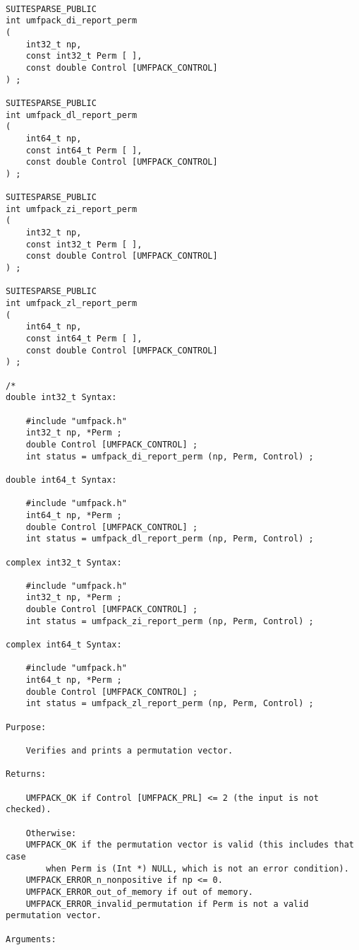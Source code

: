 \documentclass[11pt]{article}
\begin{document}
{\footnotesize
\begin{verbatim}

SUITESPARSE_PUBLIC
int umfpack_di_report_perm
(
    int32_t np,
    const int32_t Perm [ ],
    const double Control [UMFPACK_CONTROL]
) ;

SUITESPARSE_PUBLIC
int umfpack_dl_report_perm
(
    int64_t np,
    const int64_t Perm [ ],
    const double Control [UMFPACK_CONTROL]
) ;

SUITESPARSE_PUBLIC
int umfpack_zi_report_perm
(
    int32_t np,
    const int32_t Perm [ ],
    const double Control [UMFPACK_CONTROL]
) ;

SUITESPARSE_PUBLIC
int umfpack_zl_report_perm
(
    int64_t np,
    const int64_t Perm [ ],
    const double Control [UMFPACK_CONTROL]
) ;

/*
double int32_t Syntax:

    #include "umfpack.h"
    int32_t np, *Perm ;
    double Control [UMFPACK_CONTROL] ;
    int status = umfpack_di_report_perm (np, Perm, Control) ;

double int64_t Syntax:

    #include "umfpack.h"
    int64_t np, *Perm ;
    double Control [UMFPACK_CONTROL] ;
    int status = umfpack_dl_report_perm (np, Perm, Control) ;

complex int32_t Syntax:

    #include "umfpack.h"
    int32_t np, *Perm ;
    double Control [UMFPACK_CONTROL] ;
    int status = umfpack_zi_report_perm (np, Perm, Control) ;

complex int64_t Syntax:

    #include "umfpack.h"
    int64_t np, *Perm ;
    double Control [UMFPACK_CONTROL] ;
    int status = umfpack_zl_report_perm (np, Perm, Control) ;

Purpose:

    Verifies and prints a permutation vector.

Returns:

    UMFPACK_OK if Control [UMFPACK_PRL] <= 2 (the input is not checked).

    Otherwise:
    UMFPACK_OK if the permutation vector is valid (this includes that case
        when Perm is (Int *) NULL, which is not an error condition).
    UMFPACK_ERROR_n_nonpositive if np <= 0.
    UMFPACK_ERROR_out_of_memory if out of memory.
    UMFPACK_ERROR_invalid_permutation if Perm is not a valid permutation vector.

Arguments:


\end{verbatim}}
\end{document}
